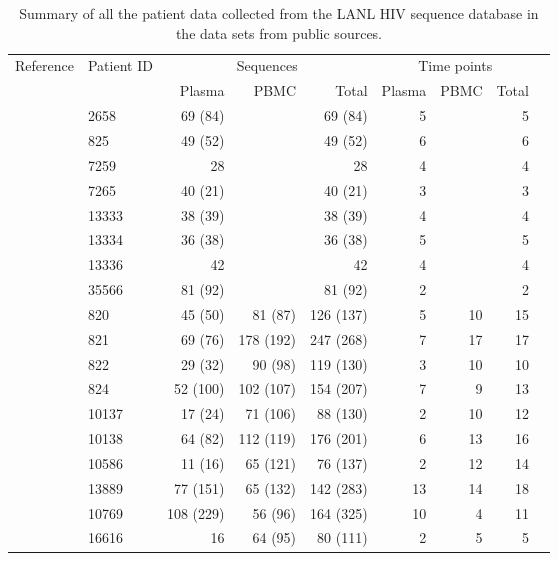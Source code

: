 \documentclass[12pt]{article}
\begin{document}
\begin{table*}
\caption{Summary of all the patient data collected from the LANL HIV sequence database \cite{LosAlamos} in the data sets from public sources.\label{tab:patients}}
\def\arraystretch{1.3}%
\begin{center}
\begin{tabular}{llrrrrrrr} 

Reference & Patient ID & \multicolumn{3}{c}{Sequences} & \multicolumn{3}{c}{Time points} \\
 &  & Plasma & PBMC & Total & Plasma & PBMC & Total\\
\hline
\cite{Simmonds91} & 2658 & 69 (84) & & 69 (84) & 5 & & 5 \\
\cite{Shankarappa99} & 825 & 49 (52) & & 49 (52) & 6 & & 6 \\
\cite{Edwards06} & 7259 & 28 & & 28 & 4 & & 4 \\
& 7265 & 40 (21) & & 40 (21) & 3 & & 3 \\
& 13333 & 38 (39) & & 38 (39) & 4 & & 4 \\
& 13334 & 36 (38) & & 36 (38) & 5 & & 5 \\
& 13336 & 42 & & 42 & 4 & & 4 \\
\cite{Schnell10} & 35566 & 81 (92) & & 81 (92) & 2 & & 2 \\
\hline
\cite{Shankarappa99} & 820 & 45 (50) & 81 (87) & 126 (137) & 5 & 10 & 15 \\
& 821 & 69 (76) & 178 (192) & 247 (268) & 7 & 17 & 17 \\ 
& 822 & 29 (32) & 90 (98) & 119 (130) & 3 & 10 & 10 \\ 
& 824 & 52 (100) & 102 (107) & 154 (207) & 7 & 9 & 13 \\
& 10137 & 17 (24) & 71 (106) & 88 (130) & 2 & 10 & 12 \\
& 10138 & 64 (82) & 112 (119) & 176 (201) & 6 & 13 & 16 \\
& 10586 & 11 (16) & 65 (121) & 76 (137) & 2 & 12 & 14 \\ 
& 13889 & 77 (151) & 65 (132) & 142 (283) & 13 & 14 & 18 \\
\cite{Fischer04} & 10769 & 108 (229) & 56 (96) & 164 (325) & 10 & 4 & 11 \\ 
\cite{Llewellyn06} & 16616 & 16 & 64 (95) & 80 (111) & 2 & 5 & 5 \\

\end{tabular}
\end{center}
\end{table*}
\end{document}
